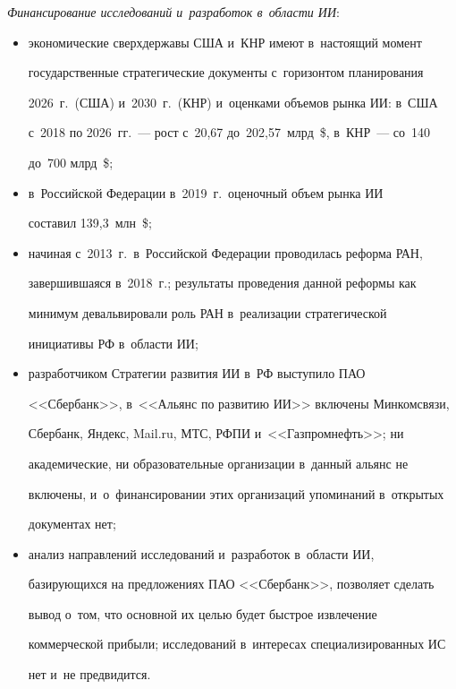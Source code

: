   \textit{Финансирование исследований и~разработок в~области ИИ}:

\begin{itemize}

\item экономические сверхдержавы США и~КНР имеют в~настоящий момент 

государственные стратегические документы с~горизонтом планирования 

2026~г.\ (США) и~2030~г.\ (КНР) и~оценками объемов рынка ИИ: в~США 

с~2018 по 2026~гг.~--- рост с~20,67 до~202,57~млрд~\$, в~КНР~--- со~140 

до~700 млрд~\$; 

\item в~Российской Федерации в~2019~г.\ оценочный объем рынка ИИ 

составил 139,3~млн~\$;

\item начиная с~2013~г.\ в~Российской Федерации проводилась реформа РАН, 

завершившаяся в~2018~г.; результаты проведения данной реформы как 

минимум девальвировали роль РАН в~реализации стратегической 

инициативы РФ в~области ИИ;

\item разработчиком Стратегии развития ИИ в~РФ выступило ПАО 

<<Сбербанк>>, в~<<Альянс по развитию ИИ>> включены Минкомсвязи, 

Сбербанк, Яндекс, Mail.ru, МТС, РФПИ и~<<Газпромнефть>>; ни 

академические, ни образовательные организации в~данный альянс не 

включены, и~о~финансировании этих организаций упоминаний в~открытых 

документах нет;

\item анализ направлений исследований и~разработок в~области ИИ, 

ба\-зи\-ру\-ющих\-ся на предложениях ПАО <<Сбербанк>>, позволяет сделать 

вывод о~том, что основной их целью будет быстрое извлечение 

коммерческой прибыли; исследований в~интересах специализированных ИС 

нет и~не предвидится.

  \end{itemize}

